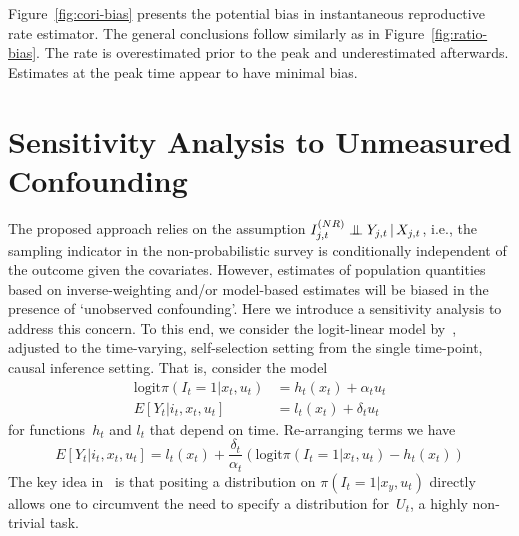\documentclass[11pt]{amsart}
\numberwithin{equation}{section}
\theoremstyle{plain}
\def\logit{\text{logit}}
\begin{document}
Figure~\ref{fig:cori-bias} presents the potential bias in instantaneous reproductive rate estimator.  The general conclusions follow similarly as in  Figure~\ref{fig:ratio-bias}. The rate is overestimated prior to the peak and underestimated afterwards.  Estimates at the peak time appear to have minimal bias.

\section{Sensitivity Analysis to Unmeasured Confounding}
\label{sec:sensitivity_confounders}

The proposed approach relies on the assumption $I_{j,t}^{(NR)} \indep Y_{j,t} \, | \, X_{j,t}$, i.e., the sampling indicator in the non-probabilistic survey is conditionally independent of the outcome given the covariates.  However, estimates of population quantities based on inverse-weighting and/or model-based estimates will be biased in the presence of `unobserved confounding'.  Here we introduce a sensitivity analysis to address this concern.  To this end, we consider the logit-linear model by~\cite{Imbens2003}, adjusted to the time-varying, self-selection setting from the single time-point, causal inference setting.  That is, consider the model
\begin{align*}
\logit \pi \left( I_{t} = 1  | x_{t}, u_{t} \right) &= h_t(x_t) + \alpha_t u_t \\
E[ Y_t | i_t, x_t, u_t] &= l_t(x_t) + \delta_t u_t
\end{align*}
for functions~$h_t$ and $l_t$ that depend on time. Re-arranging terms we have
$$
E[ Y_t | i_t, x_t, u_t ] = l_t(x_t)  + \frac{\delta_t}{\alpha_t} \left( \logit \pi \left( I_{t} = 1  | x_{t}, u_{t} \right) - h_t (x_t) \right)
$$
The key idea in~\cite{Imbens2003} is that positing a distribution on $\pi(I_t = 1 | x_y, u_t)$ directly allows one to circumvent the need to specify a distribution for~$U_t$, a highly non-trivial task.
\end{document}
